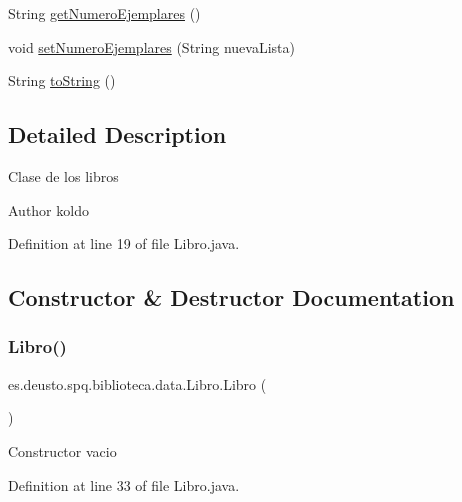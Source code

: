 \begin{DoxyCompactItemize}
\item 
String \mbox{\hyperlink{classes_1_1deusto_1_1spq_1_1biblioteca_1_1data_1_1_libro_af9baf7646d6122ef4841b6a1672a4306}{get\+Numero\+Ejemplares}} ()
\item 
void \mbox{\hyperlink{classes_1_1deusto_1_1spq_1_1biblioteca_1_1data_1_1_libro_a3531f95abf324d93f4a871f836c1cc57}{set\+Numero\+Ejemplares}} (String nueva\+Lista)
\item 
String \mbox{\hyperlink{classes_1_1deusto_1_1spq_1_1biblioteca_1_1data_1_1_libro_ac4ade112ff225403986255f1809221a7}{to\+String}} ()
\end{DoxyCompactItemize}


\subsection{Detailed Description}
Clase de los libros \begin{DoxyAuthor}{Author}
koldo 
\end{DoxyAuthor}


Definition at line 19 of file Libro.\+java.



\subsection{Constructor \& Destructor Documentation}
\mbox{\label{classes_1_1deusto_1_1spq_1_1biblioteca_1_1data_1_1_libro_ac8e8a4f99d8f310bd3685559c3871511}} 
\subsubsection{\texorpdfstring{Libro()}{Libro()}\hspace{0.1cm}{\footnotesize\ttfamily [1/2]}}
{\footnotesize\ttfamily es.\+deusto.\+spq.\+biblioteca.\+data.\+Libro.\+Libro (\begin{DoxyParamCaption}{ }\end{DoxyParamCaption})}

Constructor vacio 

Definition at line 33 of file Libro.\+java.

\mbox{\label{classes_1_1deusto_1_1spq_1_1biblioteca_1_1data_1_1_libro_abc476b8b9deff9700ad05fbf3c85f06e}} 

